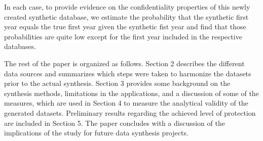 In each case, to provide evidence on the confidentiality properties of this newly created synthetic database, we estimate the probability that the synthetic first year equals the true first year given the synthetic fist year and find that those probabilities are quite low except for the first year included in the respective databases. 

The rest of the paper is organized as follows. Section 2 describes the different data sources and summarizes which steps were taken to harmonize the datasets prior to the actual synthesis. Section 3 provides some background on the synthesis methods, limitations in the applications, and a discussion of some of the measures, which are used in Section 4 to measure the analytical validity of the generated datasets. Preliminary results regarding the achieved level of protection are included in Section 5. The paper concludes with a discussion of the implications of the study for future data synthesis projects.

